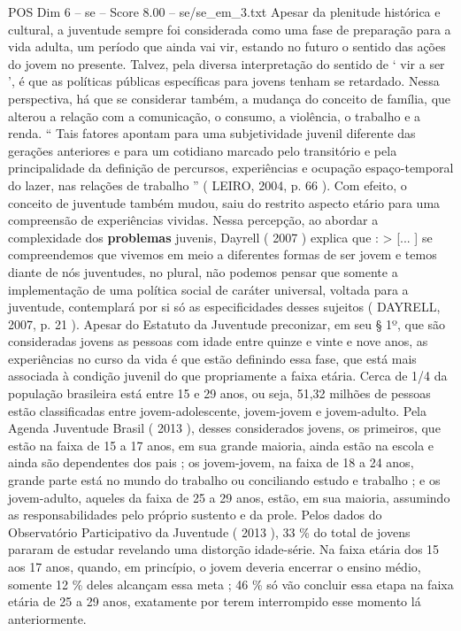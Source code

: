 \begin{textsample}{POS Dim 6 – se – Score 8.00 – se/se\_em\_3.txt}
Apesar da plenitude histórica e cultural, a juventude sempre foi considerada como uma fase de preparação para a vida adulta, um período que ainda vai vir, estando no futuro o sentido das ações do jovem no presente.
Talvez, pela diversa interpretação do sentido de ‘ vir a ser ’, é que as políticas públicas específicas para jovens tenham se retardado.
Nessa perspectiva, há que se considerar também, a mudança do conceito de família, que alterou a relação com a comunicação, o consumo, a violência, o trabalho e a renda. “ Tais fatores apontam para uma subjetividade juvenil diferente das gerações anteriores e para um cotidiano marcado pelo transitório e pela principalidade da definição de percursos, experiências e ocupação espaço-temporal do lazer, nas relações de trabalho ” ( LEIRO, 2004, p. 66 ).
Com efeito, o conceito de juventude também mudou, saiu do restrito aspecto etário para uma compreensão de experiências vividas.
Nessa percepção, ao abordar a complexidade dos \textbf{problemas} juvenis, Dayrell ( 2007 ) explica que : > [... ] se compreendemos que vivemos em meio a diferentes formas de ser jovem e temos diante de nós juventudes, no plural, não podemos pensar que somente a implementação de uma política social de caráter universal, voltada para a juventude, contemplará por si só as especificidades desses sujeitos ( DAYRELL, 2007, p. 21 ).
Apesar do Estatuto da Juventude preconizar, em seu § 1º, que são consideradas jovens as pessoas com idade entre quinze e vinte e nove anos, as experiências no curso da vida é que estão definindo essa fase, que está mais associada à condição juvenil do que propriamente a faixa etária.
Cerca de 1/4 da população brasileira está entre 15 e 29 anos, ou seja, 51,32 milhões de pessoas estão classificadas entre jovem-adolescente, jovem-jovem e jovem-adulto.
Pela Agenda Juventude Brasil ( 2013 ), desses considerados jovens, os primeiros, que estão na faixa de 15 a 17 anos, em sua grande maioria, ainda estão na escola e ainda são dependentes dos pais ; os jovem-jovem, na faixa de 18 a 24 anos, grande parte está no mundo do trabalho ou conciliando estudo e trabalho ; e os jovem-adulto, aqueles da faixa de 25 a 29 anos, estão, em sua maioria, assumindo as responsabilidades pelo próprio sustento e da prole.
Pelos dados do Observatório Participativo da Juventude ( 2013 ), 33 \% do total de jovens pararam de estudar revelando uma distorção idade-série.
Na faixa etária dos 15 aos 17 anos, quando, em princípio, o jovem deveria encerrar o ensino médio, somente 12 \% deles alcançam essa meta ; 46 \% só vão concluir essa etapa na faixa etária de 25 a 29 anos, exatamente por terem interrompido esse momento lá anteriormente.

\end{textsample}

